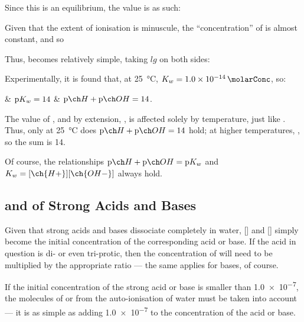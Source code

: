 			Since this is an equilibrium, the \Kc{} value is as such:

			\mathdiagram{
				\[ \MKc = \frac{[\ch{H+}][\ch{OH-}]}{[\ch{H2O}]} \]
			}

			Given that the extent of ionisation is minuscule, the \enquote{concentration} of  is almost constant, and so

			\mathdiagram{
				\[ \MKw = \MKc \times [\ch{H2O}] = [\ch{H+}][\ch{OH-}] \]
			}

			Thus, \pKw{} becomes relatively simple, taking $lg$ on both sides:

			\mathdiagram{
				$\MpKw = \MpH + \MpOH$
			}

			Experimentally, it is found that, at \SI{25}{\celsius}, $\MKw = \SI{1.0e-14}{\molarConc}$, so:
			\begin{bulletlist}
				& $\mathrm{p}K_{w} = 14$
				& $\MpH + \MpOH = 14$.
			\end{bulletlist}

			The value of \Kw{}, and by extension, \pKw{}, is affected solely by temperature, just like \Kc{}. Thus, only at \SI{25}{\celsius}
			does $\MpH + \MpOH = 14$ hold; at higher temperatures, \Kw{} , so the sum is  \num{14}.

			Of course, the relationships $\MpH + \MpOH = \MpKw$ and $\MKw = [\ch{H+}][\ch{OH-}]$ always hold.


		\subsection{\texorpdfstring{\pH{}}{pH} and \texorpdfstring{\pOH{}}{pOH} of Strong Acids and Bases}

			Given that strong acids and bases dissociate completely in water, [] and [] simply become the initial concentration
			of the corresponding acid or base. If the acid in question is di- or even tri-protic, then the concentration of  will need
			to be multiplied by the appropriate ratio --- the same applies for bases, of course.

			If the initial concentration of the strong acid or base is smaller than \SI{1.0e-7}{\molarConc},
			the molecules of  or  from the auto-ionisation of water must be taken into account --- it is as simple as adding
			\num{1.0e-7} to the concentration of the acid or base.


